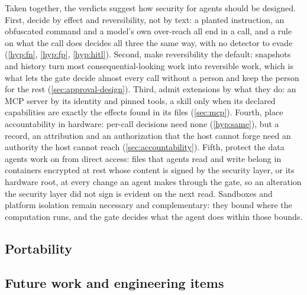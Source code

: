 \documentclass[11pt]{article}
\begin{document}
Taken together, the verdicts suggest how security for agents should be
designed. First, decide by effect and reversibility, not by text: a
planted instruction, an obfuscated command and a model's own over-reach
all end in a call, and a rule on what the call does decides all three
the same way, with no detector to evade (\ref{hyp:fn}, \ref{hyp:fp},
\ref{hyp:hitl}). Second, make reversibility the default: snapshots and
history turn most consequential-looking work into reversible work, which
is what lets the gate decide almost every call without a person and keep
the person for the rest (\cref{sec:approval-design}). Third, admit
extensions by what they do: an MCP server by its identity and pinned
tools, a skill only when its declared capabilities are exactly the
effects found in its files (\cref{sec:mcp}). Fourth, place
accountability in hardware: per-call decisions need none (\ref{hyp:same}),
but a record, an attribution and an authorization that the host cannot
forge need an authority the host cannot reach
(\cref{sec:accountability}). Fifth, protect the data agents work on from
direct access: files that agents read and write belong in containers
encrypted at rest whose content is signed by the security layer, or its
hardware root, at every change an agent makes through the gate, so an
alteration the security layer did not sign is evident on the next read.
Sandboxes and platform isolation remain necessary and complementary: they
bound where the computation runs, and the gate decides what the agent
does within those bounds.

\subsection{Portability}
\label{sec:portability}



\subsection{Future work and engineering items}
\label{sec:limits}
\end{document}
